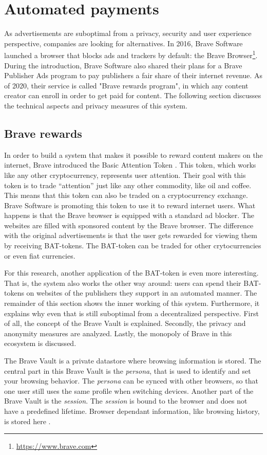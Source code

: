 \section{Automated payments}
As advertisements are suboptimal from a privacy, security and user experience perspective, companies are looking for alternatives. In 2016, Brave Software launched a browser that blocks ads and trackers by default: the Brave Browser\footnote{\url{https://www.brave.com}}. During the introduction, Brave Software also shared their plans for a Brave Publisher Ads program to pay publishers a fair share of their internet revenue. As of 2020, their service is called "Brave rewards program", in which any content creator can enroll in order to get paid for content. The following section discusses the technical aspects and privacy measures of this system.

\subsection{Brave rewards}
\label{sec:brave}
In order to build a system that makes it possible to reward content makers on the internet, Brave introduced the Basic Attention Token \cite{token2018blockchain}. This token, which works like any other cryptocurrency, represents user attention. Their goal with this token is to trade “attention” just like any other commodity, like oil and coffee. This means that this token can also be traded on a cryptocurrency exchange. Brave Software is promoting this token to use it to reward internet users. What happens is that the Brave browser is equipped with a standard ad blocker. The websites are filled with sponsored content by the Brave browser. The difference with the original advertisements is that the user gets rewarded for viewing them by receiving BAT-tokens. The BAT-token can be traded for other crytocurrencies or even fiat currencies.

For this research, another application of the BAT-token is even more interesting. That is, the system also works the other way around: users can spend their BAT-tokens on websites of the publishers they support in an automated manner. The remainder of this section shows the inner working of this system. Furthermore, it explains why even that is still suboptimal from a decentralized perspective. First of all, the concept of the Brave Vault is explained. Secondly, the privacy and anonymity measures are analyzed. Lastly, the monopoly of Brave in this ecosystem is discussed.

The Brave Vault is a private datastore where browsing information is stored. The central part in this Brave Vault is the \textit{persona}, that is used to identify and set your browsing behavior. The \textit{persona} can be synced with other browsers, so that one user still uses the same profile when switching devices. Another part of the Brave Vault is the \textit{session}. The \textit{session} is bound to the browser and does not have a predefined lifetime. Browser dependant information, like browsing history, is stored here \cite{brave-vault}.


